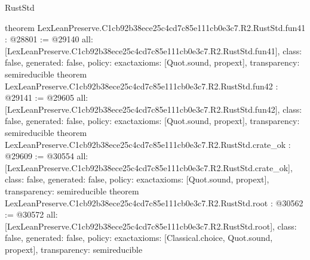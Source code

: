\begin{lexlean}{RustStd}
\begin{coremodule}
{}
theorem LexLeanPreserve.C1cb92b38ece25c4cd7c85e111cb0e3c7.R2.RustStd.fun41 : @28801 := @29140 {
  all: [LexLeanPreserve.C1cb92b38ece25c4cd7c85e111cb0e3c7.R2.RustStd.fun41],
  class: false,
  generated: false,
  policy: exact{axioms: [Quot.sound, propext]},
  transparency: semireducible
}
theorem LexLeanPreserve.C1cb92b38ece25c4cd7c85e111cb0e3c7.R2.RustStd.fun42 : @29141 := @29605 {
  all: [LexLeanPreserve.C1cb92b38ece25c4cd7c85e111cb0e3c7.R2.RustStd.fun42],
  class: false,
  generated: false,
  policy: exact{axioms: [Quot.sound, propext]},
  transparency: semireducible
}
theorem LexLeanPreserve.C1cb92b38ece25c4cd7c85e111cb0e3c7.R2.RustStd.crate_ok : @29609 := @30554 {
  all: [LexLeanPreserve.C1cb92b38ece25c4cd7c85e111cb0e3c7.R2.RustStd.crate_ok],
  class: false,
  generated: false,
  policy: exact{axioms: [Quot.sound, propext]},
  transparency: semireducible
}
theorem LexLeanPreserve.C1cb92b38ece25c4cd7c85e111cb0e3c7.R2.RustStd.root : @30562 := @30572 {
  all: [LexLeanPreserve.C1cb92b38ece25c4cd7c85e111cb0e3c7.R2.RustStd.root],
  class: false,
  generated: false,
  policy: exact{axioms: [Classical.choice, Quot.sound, propext]},
  transparency: semireducible
}


\end{coremodule}
\end{lexlean}
